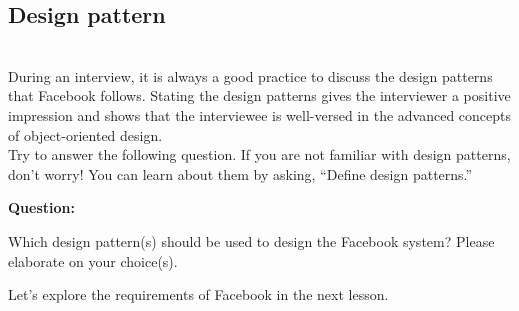 \subsection{Design pattern~}\label{PLRSQybk-sqG3V2A6v2vu}
\\
During an interview, it is always a good practice to discuss the design patterns that Facebook follows. Stating the design patterns gives the interviewer a positive impression and shows that the interviewee is well-versed in the advanced concepts of object-oriented design.
\\
Try to answer the following question. If you are not familiar with design patterns, don't worry! You can learn about them by asking, ``Define design patterns.''

\textbf{Question:}

Which design pattern(s) should be used to design the Facebook system? Please elaborate on your choice(s).

Let's explore the requirements of Facebook in the next lesson.

